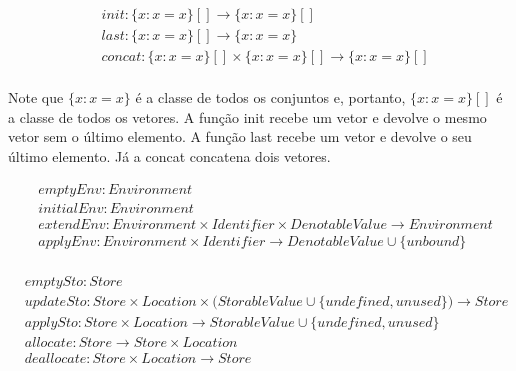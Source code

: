 \documentclass[12pt]{article}
\begin{document}
\begin{align*}
&init:\{x: x = x\}[] \rightarrow \{x: x = x\}[] \\
&last:\{x: x = x\}[] \rightarrow \{x: x = x\} \\
&concat:\{x: x = x\}[] \times \{x: x = x\}[] \rightarrow \{x : x = x\}[] \\
\end{align*}

Note que $\{x: x = x\}$ é a classe de todos os conjuntos e, portanto, $\{x: x = x\}[]$ é a classe de todos os vetores. A função init recebe um vetor e devolve o mesmo vetor sem o último elemento. A função last recebe um vetor e devolve o seu último elemento. Já a concat concatena dois vetores.

\begin{align*}
&emptyEnv:Environment \\
&initialEnv:Environment\\
&extendEnv:Environment\times Identifier\times DenotableValue\to Environment \\
&applyEnv:Environment\times Identifier\to DenotableValue\cup \{unbound\} \\
\end{align*}

\begin{align*}
&emptySto:Store \\
&updateSto:Store\times Location \times \big(StorableValue \cup \{undefined, unused\}\big) \to Store \\
&applySto:Store\times Location \to StorableValue\cup \{undefined, unused\} \\
&allocate:Store\to Store\times Location \\
&deallocate:Store\times Location \to Store \\
\end{align*}
\end{document}

